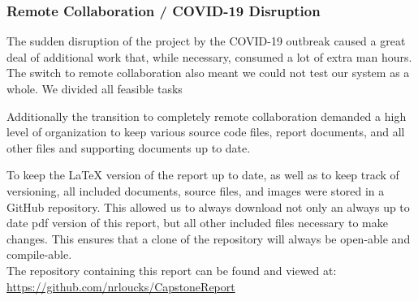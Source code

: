 		\subsubsection{Remote Collaboration / COVID-19 Disruption}
		\par The sudden disruption of the project by the COVID-19 outbreak caused a great deal of additional work that, while necessary, consumed a lot of extra man hours. The switch to remote collaboration also meant we could not test our system as a whole. We divided all feasible tasks 
		\par Additionally the transition to completely remote collaboration demanded a high level of organization to keep various source code files, report documents, and all other files and supporting documents up to date.
		\par To keep the LaTeX version of the report up to date, as well as to keep track of versioning, all included documents, source files, and images were stored in a GitHub repository. This allowed us to always download not only an always up to date pdf version of this report, but all other included files necessary to make changes. This ensures that a clone of the repository will always be open-able and compile-able. \\
		The repository containing this report can be found and viewed at: \\
		\url{https://github.com/nrloucks/CapstoneReport} 